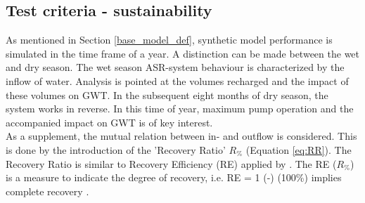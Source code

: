 

\subsection{Test criteria - sustainability}
As mentioned in Section \ref{base_model_def}, synthetic model performance is simulated in the time frame of a year. A distinction can be made between the wet and dry season. The wet season ASR-system behaviour is characterized by the inflow of water. Analysis is pointed at the volumes recharged and the impact of these volumes on GWT. In the subsequent eight months of dry season, the system works in reverse. In this time of year, maximum pump operation and the accompanied impact on GWT is of key interest. \\
As a supplement, the mutual relation between in- and outflow is considered. This is done by the introduction of the 'Recovery Ratio' $R_{\%}$ (Equation \ref{eq:RR}). The Recovery Ratio is similar to Recovery Efficiency (RE) applied by \citet{Ward2007}. The RE ($R_{\%}$) is a measure to indicate the degree of recovery, i.e. RE = 1 (-) (100\%) implies complete recovery \citep{Ward2007}. 

